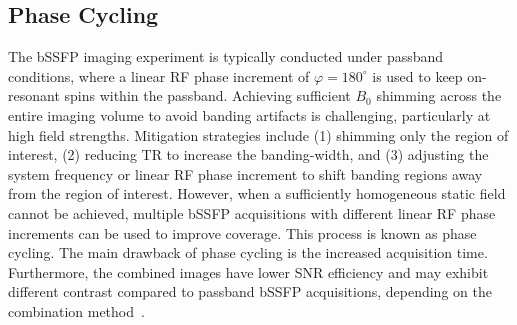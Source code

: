 \subsection{Phase Cycling}
The bSSFP imaging experiment is typically conducted under passband conditions, where a linear \gls{RF} phase increment of $\varphi = 180^\circ$ is used to keep on-resonant spins within the passband. Achieving sufficient $B_0$ shimming across the entire imaging volume to avoid banding artifacts is challenging, particularly at high field strengths. Mitigation strategies include (1) shimming only the region of interest, (2) reducing TR to increase the banding-width, and (3) adjusting the system frequency or linear RF phase increment to shift banding regions away from the region of interest. However, when a sufficiently homogeneous static field cannot be achieved, multiple bSSFP acquisitions with different linear RF phase increments can be used to improve coverage. This process is known as phase cycling. The main drawback of phase cycling is the increased acquisition time. Furthermore, the combined images have lower \gls{SNR} efficiency and may exhibit different contrast compared to passband \gls{bSSFP} acquisitions, depending on the combination method~\cite{bangerterAnalysisMultipleacquisitionSSFP2004}.
 
